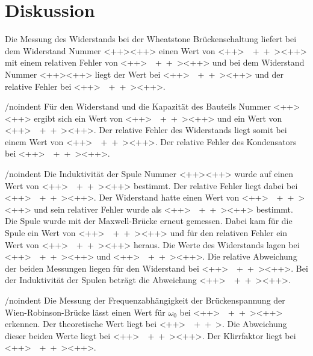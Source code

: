 \section{Diskussion}
\label{sec:Diskussion}

Die Messung des Widerstands bei der Wheatstone Brückenschaltung liefert bei dem Widerstand Nummer \num{<++>}<++> einen Wert von \SI{<++>}{\<++>}<++> mit einem relativen Fehler von \SI{<++>}{\<++>}<++> und bei dem Widerstand Nummer \num{<++>}<++> liegt der Wert bei \SI{<++>}{\<++>}<++> und der relative Fehler bei \SI{<++>}{\<++>}<++>. 

/noindent Für den Widerstand und die Kapazität des Bauteils Nummer \num{<++>}<++> ergibt sich ein Wert von \SI{<++>}{\<++>}<++> und ein Wert von \SI{<++>}{\<++>}<++>. Der relative Fehler des Widerstands liegt somit bei einem Wert von \SI{<++>}{\<++>}<++>. Der relative Fehler des Kondensators bei \SI{<++>}{\<++>}<++>. 

/noindent Die Induktivität der Spule Nummer \num{<++>}<++> wurde auf einen Wert von \SI{<++>}{\<++>}<++> bestimmt. Der relative Fehler liegt dabei bei \SI{<++>}{\<++>}<++>. Der Widerstand hatte einen Wert von \SI{<++>}{\<++>}<++> und sein relativer Fehler wurde als \SI{<++>}{\<++>}<++> bestimmt. 
Die Spule wurde mit der Maxwell-Brücke erneut gemessen. Dabei kam für die Spule ein Wert von \SI{<++>}{\<++>}<++> und für den relativen Fehler ein Wert von \SI{<++>}{\<++>}<++> heraus. Die Werte des Widerstands lagen bei \SI{<++>}{\<++>}<++> und \SI{<++>}{\<++>}<++>. Die relative Abweichung der beiden Messungen liegen für den Widerstand bei \SI{<++>}{\<++>}<++>. Bei der Induktivität der Spulen beträgt die Abweichung \SI{<++>}{\<++>}<++>. 

/noindent Die Messung der Frequenzabhängigkeit der Brückenspannung der Wien-Robinson-Brücke lässt einen Wert für $\omega_0$ bei \SI{<++>}{\<++>}<++> erkennen. Der theoretische Wert liegt bei \SI{<++>}{\<++>}. Die Abweichung dieser beiden Werte liegt bei \SI{<++>}{\<++>}<++>. Der Klirrfaktor liegt bei \SI{<++>}{\<++>}<++>. 
